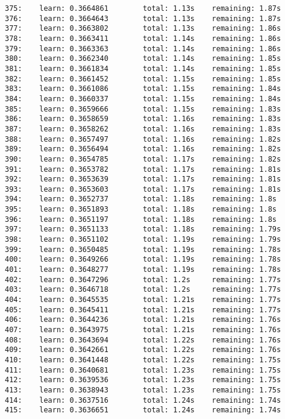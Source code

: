 \documentclass[11pt]{article}
\begin{document}
\begin{Verbatim}[commandchars=\\\{\}]
375:    learn: 0.3664861        total: 1.13s    remaining: 1.87s
376:    learn: 0.3664643        total: 1.13s    remaining: 1.87s
377:    learn: 0.3663802        total: 1.13s    remaining: 1.86s
378:    learn: 0.3663411        total: 1.14s    remaining: 1.86s
379:    learn: 0.3663363        total: 1.14s    remaining: 1.86s
380:    learn: 0.3662340        total: 1.14s    remaining: 1.85s
381:    learn: 0.3661834        total: 1.14s    remaining: 1.85s
382:    learn: 0.3661452        total: 1.15s    remaining: 1.85s
383:    learn: 0.3661086        total: 1.15s    remaining: 1.84s
384:    learn: 0.3660337        total: 1.15s    remaining: 1.84s
385:    learn: 0.3659666        total: 1.15s    remaining: 1.83s
386:    learn: 0.3658659        total: 1.16s    remaining: 1.83s
387:    learn: 0.3658262        total: 1.16s    remaining: 1.83s
388:    learn: 0.3657497        total: 1.16s    remaining: 1.82s
389:    learn: 0.3656494        total: 1.16s    remaining: 1.82s
390:    learn: 0.3654785        total: 1.17s    remaining: 1.82s
391:    learn: 0.3653782        total: 1.17s    remaining: 1.81s
392:    learn: 0.3653639        total: 1.17s    remaining: 1.81s
393:    learn: 0.3653603        total: 1.17s    remaining: 1.81s
394:    learn: 0.3652737        total: 1.18s    remaining: 1.8s
395:    learn: 0.3651893        total: 1.18s    remaining: 1.8s
396:    learn: 0.3651197        total: 1.18s    remaining: 1.8s
397:    learn: 0.3651133        total: 1.18s    remaining: 1.79s
398:    learn: 0.3651102        total: 1.19s    remaining: 1.79s
399:    learn: 0.3650485        total: 1.19s    remaining: 1.78s
400:    learn: 0.3649266        total: 1.19s    remaining: 1.78s
401:    learn: 0.3648277        total: 1.19s    remaining: 1.78s
402:    learn: 0.3647296        total: 1.2s     remaining: 1.77s
403:    learn: 0.3646718        total: 1.2s     remaining: 1.77s
404:    learn: 0.3645535        total: 1.21s    remaining: 1.77s
405:    learn: 0.3645411        total: 1.21s    remaining: 1.77s
406:    learn: 0.3644236        total: 1.21s    remaining: 1.76s
407:    learn: 0.3643975        total: 1.21s    remaining: 1.76s
408:    learn: 0.3643694        total: 1.22s    remaining: 1.76s
409:    learn: 0.3642661        total: 1.22s    remaining: 1.76s
410:    learn: 0.3641448        total: 1.22s    remaining: 1.75s
411:    learn: 0.3640681        total: 1.23s    remaining: 1.75s
412:    learn: 0.3639536        total: 1.23s    remaining: 1.75s
413:    learn: 0.3638943        total: 1.23s    remaining: 1.75s
414:    learn: 0.3637516        total: 1.24s    remaining: 1.74s
415:    learn: 0.3636651        total: 1.24s    remaining: 1.74s

\end{Verbatim}
\end{document}
